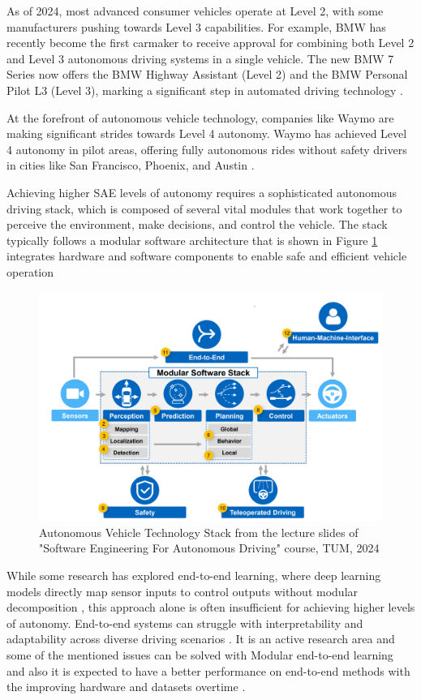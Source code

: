 As of 2024, most advanced consumer vehicles operate at Level 2, with some manufacturers pushing towards Level 3 capabilities. For example, BMW has recently become the first carmaker to receive approval for combining both Level 2 and Level 3 autonomous driving systems in a single vehicle. The new BMW 7 Series now offers the BMW Highway Assistant (Level 2) and the BMW Personal Pilot L3 (Level 3), marking a significant step in automated driving technology \cite{bmw2024}.

At the forefront of autonomous vehicle technology, companies like Waymo
are making significant strides towards Level 4 autonomy. Waymo has achieved
Level 4 autonomy in pilot areas, offering fully autonomous rides without safety
 drivers in cities like San Francisco, Phoenix, and Austin \cite{evmagazine2024}.

 Achieving higher SAE levels of autonomy requires a sophisticated autonomous driving stack,
 which is composed of several vital modules that work together to perceive the environment,
 make decisions, and control the vehicle. The stack typically follows a modular software
 architecture that is shown in Figure \ref{fig:AVStack} integrates hardware and software components to enable safe and
 efficient vehicle operation

\begin{figure}[h]
    \includegraphics[scale=0.14]{figures/AVStack.png}
    \centering
    \caption{Autonomous Vehicle Technology Stack
    from the lecture slides of "Software Engineering For Autonomous Driving" course, TUM, 2024} %
    \label{fig:AVStack}
\end{figure}

While some research has explored end-to-end learning, where deep learning models directly map sensor inputs
to control outputs without modular decomposition \cite{codevilla2019limitations}, this approach alone is often
insufficient for achieving higher levels of autonomy. End-to-end systems can struggle with interpretability
and adaptability across diverse driving scenarios \cite{e2e}. It is an active research area and some
of the mentioned issues can be solved with Modular end-to-end learning \cite{nvidia2022diffstack} and also
it is expected to have a better performance on end-to-end methods with the improving hardware and datasets overtime \cite{e2e}.

